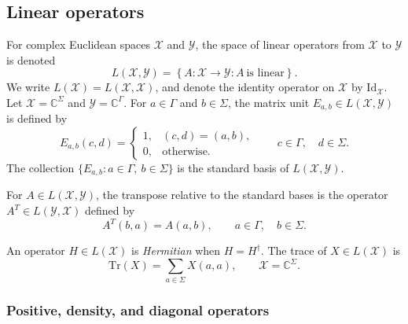\documentclass[
    aps,
    pra,
    reprint,
    superscriptaddress,
    nofootinbib
]{revtex4-2}
\theoremstyle{definition}
\theoremstyle{plain}
\begin{document}
\subsection{Linear operators}

For complex Euclidean spaces $\mathcal{X}$ and $\mathcal{Y}$, the space of
linear operators from $\mathcal{X}$ to $\mathcal{Y}$ is denoted
\begin{equation}
    L(\mathcal{X},\mathcal{Y})
    =
    \left\{A:\mathcal{X}\to\mathcal{Y}:A\ \text{is linear}\right\}.
\end{equation} We write $L(\mathcal{X})=L(\mathcal{X},\mathcal{X})$, and denote the identity operator on $\mathcal{X}$ by $\mathrm{Id}_{\mathcal{X}}$. Let $\mathcal{X}=\mathbb{C}^{\Sigma}$ and
$\mathcal{Y}=\mathbb{C}^{\Gamma}$. 
For $a\in\Gamma$ and $b\in\Sigma$, the matrix unit
$E_{a,b}\in L(\mathcal{X},\mathcal{Y})$ is defined by
\begin{equation}
    E_{a,b}(c,d)=
    \begin{cases}
        1, & (c,d)=(a,b),\\
        0, & \text{otherwise}.
    \end{cases}
    \qquad c\in\Gamma,\quad d\in\Sigma.
\end{equation} The collection $\{E_{a,b}:a\in\Gamma,\ b\in\Sigma\}$ is the standard basis of $L(\mathcal{X},\mathcal{Y})$.

For $A\in L(\mathcal{X},\mathcal{Y})$, the transpose relative to the
standard bases is the operator $A^{T}\in L(\mathcal{Y},\mathcal{X})$
defined by
\begin{equation}
    A^{T}(b,a)=A(a,b),
    \qquad a\in\Gamma,\quad b\in\Sigma.
\end{equation}

An operator
$H\in L(\mathcal{X})$ is \emph{Hermitian} when $H=H^\dagger$.
The trace of $X\in L(\mathcal{X})$ is
\begin{equation}
    \mathrm{Tr}(X)=\sum_{a\in\Sigma}X(a,a),
    \qquad \mathcal{X}=\mathbb{C}^{\Sigma}.
\end{equation}

\subsubsection{Positive, density, and diagonal operators}
\end{document}
